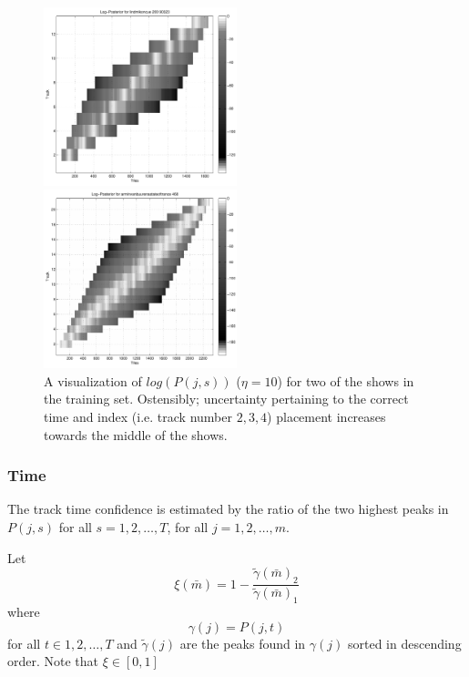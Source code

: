 \documentclass[twocolumn]{article}
\begin{document}
	\begin{figure}
		\centering
		\includegraphics[width=0.5\textwidth]{images/posterior2}
		
		\bigskip
		
		\includegraphics[width=0.5\textwidth]{images/posterior3}
		\caption{A visualization of $log(P(j,s))$ ($\eta=10$) for two of the shows in the training set. Ostensibly; uncertainty pertaining to the correct time and index (i.e. track number $2,3,4$) placement increases towards the middle of the shows.}
		\label{fig:posterior3}
	\end{figure} 


\subsubsection{Time}

The track time confidence is estimated by the ratio of the two highest peaks in $P(j,s)$ for all $s=1,2,\ldots,T$, for all $j=1,2,\ldots,m$.

Let 
\[
\xi(\bar m)= 1 - \frac{ \tilde \gamma\left( \bar m \right)  _2 }{ \tilde \gamma\left( \bar m \right)   _1 }
\] where \[
\gamma(j) = P(j,t)
\] for all $t \in 1,2,\ldots,T$ and $\tilde \gamma(j)$ are the peaks found in $\gamma(j)$ sorted in descending order. Note that $\xi \in [0,1]$
\end{document}
